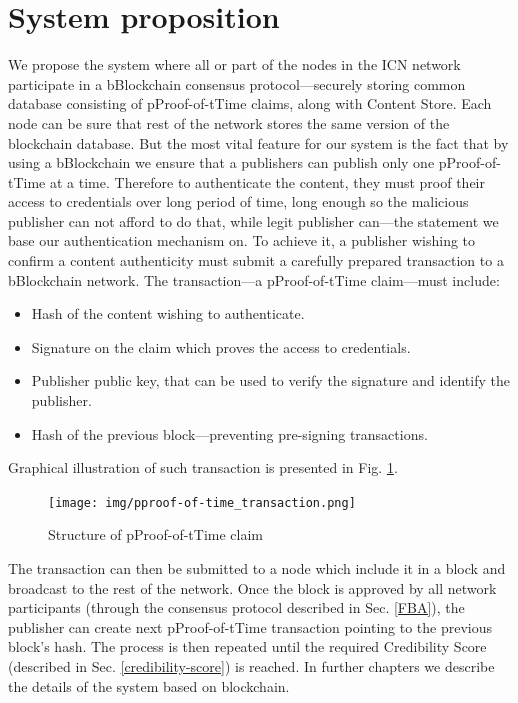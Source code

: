 \section{System proposition}
We propose the system where all or part of the nodes in the ICN network participate in a bBlockchain consensus protocol––securely storing common database consisting of pProof-of-tTime claims, along with Content Store. Each node can be sure that rest of the network stores the same version of the blockchain database. But the most vital feature for our system is the fact that by using a bBlockchain we ensure that a publishers can publish only one pProof-of-tTime at a time. Therefore  to authenticate the content, they must proof their access to credentials over long period of time, long enough so the malicious publisher can not afford to do that, while legit publisher can––the statement we base our authentication mechanism on. To achieve it, a publisher wishing to confirm a content authenticity must submit a carefully prepared transaction to a bBlockchain network. The transaction––a pProof-of-tTime claim––must include:
\begin{itemize}
    \item Hash of the content wishing to authenticate.
    \item Signature on the claim which proves the access to credentials.
    \item Publisher public key, that can be used to verify the signature and identify the publisher.
    \item Hash of the previous block––preventing pre-signing transactions.
\end{itemize}
Graphical illustration of such transaction is presented in Fig. \ref{fig:pproof-of-time}.
\begin{figure}[h!]
    \centering
    \texttt{[image: img/pproof-of-time\_transaction.png]}
    \caption{Structure of pProof-of-tTime claim}
    \label{fig:pproof-of-time}
\end{figure}

The transaction can then be submitted to a node which include it in a block and broadcast to the rest of the network. Once the block is approved by all network participants (through the consensus protocol described in Sec. \ref{FBA}), the publisher can create next pProof-of-tTime transaction pointing to the previous block's hash. The process is then repeated until the required Credibility Score (described in Sec. \ref{credibility-score}) is reached. In further chapters we describe the details of the system based on blockchain.

